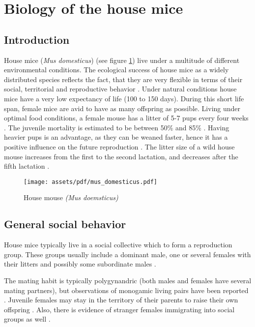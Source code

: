 \newpage
\section{Biology of the house mice}
\label{sec:biolhousemice}

\subsection{Introduction}
\label{subsec:introduction}

House mice (\textit{Mus domesticus}) (see figure \ref{fig:housemice}) live under a multitude of different environmental conditions. The ecological success of house mice as a widely distributed species reflects the fact, that they are very flexible in terms of their social, territorial and reproductive behavior \cite{bronson:79, bronson:84, berry:81}. Under natural conditions house mice have a very low expectancy of life (100 to 150 days). During this short life span, female mice are avid to have as many offspring as possible. Living under optimal food conditions, a female mouse has a litter of 5-7 pups every four weeks \cite{berry:71, pelikan:81}. The juvenile mortality is estimated to be between 50\% and 85\% \cite{berry:71, berry:75, pennycuik:86}. Having heavier pups is an advantage, as they can be weaned faster, hence it has a positive influence on the future reproduction \cite{fuchs:82}. The litter size of a wild house mouse increases from the first to the second lactation, and decreases after the fifth lactation \cite{pelikan:81, koenig:87b}. 

\begin{figure}[htbp]	
\centering	
\texttt{[image: assets/pdf/mus\_domesticus.pdf]}	
\caption[House mice]{House mouse \textit{(Mus doemsticus)}}
\label{fig:housemice}
\end{figure}

\subsection{General social behavior}
\label{subsec:socialbehaviour}
House mice typically live in a social collective which to form a reproduction group. These groups usually include a dominant male, one or several females with their litters and possibly some subordinate males \cite{crowcroft:63, reimer:67, selander:70, mackintosh:81}.

The mating habit is typically polygynandric (both males and females have several mating partners), but observations of monogamic living pairs have been reported \cite{lidicker:76}. Juvenile females may stay in the territory of their parents to raise their own offspring \cite{petras:67}. Also, there is evidence of stranger females immigrating into social groups as well \cite{anderson:65, reimer:67, selander:70, bronson:79, baker:81}.     

